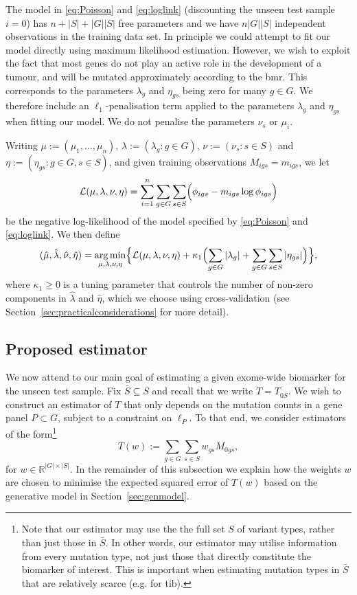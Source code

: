 \documentclass[12pt]{article}
\DeclareMathOperator*{\argmin}{arg\,min}
\begin{document}
The model in \eqref{eq:Poisson} and \eqref{eq:loglink} (discounting the unseen test sample $i=0$) has $n + |S| + |G||S|$ free parameters and we have $n|G||S|$ independent observations in the training data set. In principle we could attempt to fit our model directly using maximum likelihood estimation. However, we wish to exploit the fact that most genes do not play an active role in the development of a tumour, and will be mutated approximately according to the \gls{bmr}. This corresponds to the parameters $\lambda_g$ and $\eta_{gs}$ being zero for many $g \in G$. We therefore include an $\ell_1$-penalisation term applied to the parameters $\lambda_g$ and $\eta_{gs}$ when fitting our model. We do not penalise the parameters $\nu_s$ or $\mu_i$.

Writing $\mu := (\mu_1,\ldots, \mu_n)$, $\lambda := (\lambda_g :g \in G)$, $\nu := (\nu_s: s \in S)$ and $\eta := (\eta_{gs}: g\in G, s\in S)$, and given training observations $M_{igs} = m_{igs}$, we let
\[
\mathcal{L}(\mu, \lambda, \nu, \eta) = \sum_{i = 1}^n \sum_{g \in G} \sum_{s \in S} \Bigl( \phi_{igs} - m_{igs} \log \phi_{igs} \Bigr) 
\]
be the negative log-likelihood of the model specified by \eqref{eq:Poisson} and \eqref{eq:loglink}. We then define
\begin{equation}
(\hat{\mu}, \hat{\lambda}, \hat{\nu}, \hat{\eta}) = \argmin_{\mu,\lambda, \nu, \eta} \Bigl\{ \mathcal{L}(\mu, \lambda, \nu, \eta) + \kappa_1 \Bigl(\sum_{g \in G} |\lambda_g|  +  \sum_{g \in G} \sum_{s \in S} |\eta_{gs}| \Bigr) \Bigr\},
\label{eq:genparams}
\end{equation}
where $\kappa_1 \geq 0$ is a tuning parameter that controls the number of non-zero components in $\hat{\lambda}$ and $\hat{\eta}$, which we choose using cross-validation (see Section~\ref{sec:practicalconsiderations} for more detail). 


\subsection{Proposed estimator \label{sec:linearestimator}}
We now attend to our main goal of estimating a given exome-wide biomarker for the unseen test sample. Fix $\bar{S} \subseteq S$ and recall that we write $T = T_{0\bar{S}}$. We wish to construct an estimator of $T$ that only depends on the mutation counts in a gene panel $P \subset G$, subject to a constraint on $\ell_P$. To that end, we consider estimators of the form\footnote{Note that our estimator may use the the full set $S$ of variant types, rather than just those in $\bar{S}$. In other words, our estimator may utilise information from every mutation type, not just those that directly constitute the biomarker of interest. This is important when estimating mutation types in $\bar{S}$ that are relatively scarce (e.g. for \gls{tib}).}
\[
T(w) := \sum_{g \in G} \sum_{s \in S} w_{gs}M_{0gs},
\]
for $w \in \mathbb{R}^{|G|\times |S|}$.  In the remainder of this subsection we explain how the weights $w$ are chosen to minimise the expected squared error of $T(w)$ based on the generative model in Section~\ref{sec:genmodel}. 
\end{document}
